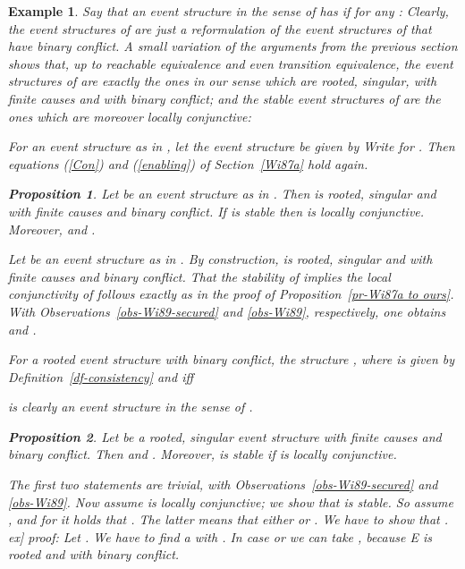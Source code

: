 \documentclass[twocolumn]{article}
\newtheorem{prop}{Proposition}[section]
\newtheorem{exam}{Example}
\newenvironment{proposition}[1]{\begin{prop} \rm \label{pr-#1} }{\end{prop}}
\newenvironment{example}[1]{\begin{exam} \rm \label{ex-#1} }{\end{exam}}
\newenvironment{proof}{\begin{trivlist} \item[\hspace{\labelsep}\bf
Proof:]}{\hfill \end{trivlist}}
\newcommand{\df}[1]{Definition~\ref{df-#1}}
\newcommand{\pr}[1]{Proposition~\ref{pr-#1}}
\newcommand{\phrase}[1]{\index{#1}{\em #1}}		\newcommand{\implies}{\Rightarrow}
\begin{document}
\begin{example}{causality}
Say that an event structure  in the sense of
\cite{Wi87a} has \phrase{binary conflict} if for any : 
Clearly, the event structures of \cite{Wi89} are just a reformulation
of the event structures of \cite{Wi87a} that have binary conflict.
A small variation of the arguments from the previous section shows
that, up to reachable equivalence and even transition equivalence, the event
structures of \cite{Wi89} are exactly the ones in our sense which are
rooted, singular, with finite causes and with binary conflict; and the
stable event structures of \cite{Wi89} are the ones which are moreover
locally conjunctive:

For  an event structure as in
\cite{Wi89}, let the event structure 
be given by 
Write  for .
Then equations (\ref{Con}) and (\ref{enabling}) of Section~\ref{Wi87a} hold again.

\begin{proposition}{Wi89 to ours}
Let  be an event structure as in \cite{Wi89}. Then
 is rooted, singular and with finite causes and binary
conflict. If  is stable then  is locally conjunctive.
Moreover,  and .
\end{proposition}

\begin{proof} Let  be an event
structure as in \cite{Wi89}. By construction,  is rooted,
singular and with finite causes and binary conflict.  That the
stability of  implies the local conjunctivity of 
follows exactly as in the proof of \pr{Wi87a to ours}.  With
Observations~\ref{obs-Wi89-secured} and \ref{obs-Wi89}, respectively,
one obtains  and .
\end{proof}
For  a rooted event structure with binary
conflict, the structure ,
where  is given by \df{consistency} and
  iff

is clearly an event structure in the sense of \cite{Wi89}.
\begin{proposition}{ours to Wi89}
Let  be a rooted, singular event structure with finite causes and
binary conflict. Then 
and .
Moreover,  is stable if  is locally conjunctive.
\end{proposition}

\begin{proof}
The first two statements are trivial, with
Observations~\ref{obs-Wi89-secured} and \ref{obs-Wi89}.  Now assume
 is locally conjunctive; we show that  is
stable. So assume ,  and for  it holds that . The latter means that
either  or . We have to show that .
\1ex]
{\sc proof:}
Let . We have to find a  with .
In case  or  we can take , because E is
rooted and with binary conflict.


\end{proof}
\end{example}
\end{document}

